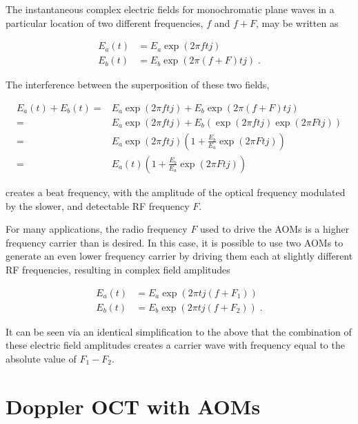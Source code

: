 The instantaneous complex electric fields for monochromatic plane waves in a particular location of two different frequencies, $f$ and $f + F$, may be written as

\begin{equation}
\begin{aligned}
E_a(t) & = E_a \exp{(2 \pi ft j)} \\
E_b(t) & = E_b \exp{(2 \pi (f + F)t j)} \; .
\label{eq:complex_field_amplitudes}
\end{aligned}
\end{equation}

The interference between the superposition of these two fields,

\begin{equation}
\begin{aligned}
E_a(t) + E_b(t) = & E_a \exp{(2 \pi ftj)} + E_b \exp{(2 \pi (f + F)t j)} \\
= & E_a \exp{(2 \pi ftj)} + E_b (\exp{(2 \pi ftj)} \exp{(2 \pi Ftj)}) \\
= & E_a \exp{(2 \pi ftj)} (1 + \frac{E_b}{E_a} \exp{(2 \pi Ftj)}) \\
= & E_a(t) (1 + \frac{E_b}{E_a} \exp{(2 \pi Ftj)})
\end{aligned}
\end{equation}

\noindent creates a beat frequency, with the amplitude of the optical frequency modulated by the slower, and detectable RF frequency $F$.

For many applications, the radio frequency $F$ used to drive the AOMs is a higher frequency carrier than is desired. In this case, it is possible to use two AOMs to generate an even lower frequency carrier by driving them each at slightly different RF frequencies, resulting in complex field amplitudes 

\begin{equation}
\begin{aligned}
E_a(t) & = E_a \exp{(2 \pi t j (f + F_1))} \\
E_b(t) & = E_b \exp{(2 \pi t j (f + F_2))} \; .
\end{aligned}
\end{equation}

It can be seen via an identical simplification to the above that the combination of these electric field amplitudes creates a carrier wave with frequency equal to the absolute value of $F_1 - F_2$.

\section{Doppler OCT with AOMs}
\label{sec:Doppler_aom}


